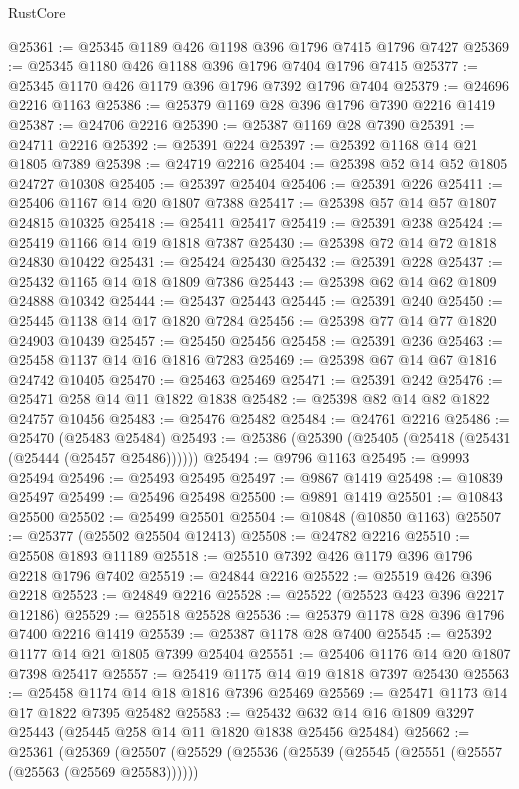 \begin{lexlean}{RustCore}
\begin{coremodule}
@25361 := @25345 @1189 @426 @1198 @396 @1796 @7415 @1796 @7427
@25369 := @25345 @1180 @426 @1188 @396 @1796 @7404 @1796 @7415
@25377 := @25345 @1170 @426 @1179 @396 @1796 @7392 @1796 @7404
@25379 := @24696 @2216 @1163
@25386 := @25379 @1169 @28 @396 @1796 @7390 @2216 @1419
@25387 := @24706 @2216
@25390 := @25387 @1169 @28 @7390
@25391 := @24711 @2216
@25392 := @25391 @224
@25397 := @25392 @1168 @14 @21 @1805 @7389
@25398 := @24719 @2216
@25404 := @25398 @52 @14 @52 @1805 @24727 @10308
@25405 := @25397 @25404
@25406 := @25391 @226
@25411 := @25406 @1167 @14 @20 @1807 @7388
@25417 := @25398 @57 @14 @57 @1807 @24815 @10325
@25418 := @25411 @25417
@25419 := @25391 @238
@25424 := @25419 @1166 @14 @19 @1818 @7387
@25430 := @25398 @72 @14 @72 @1818 @24830 @10422
@25431 := @25424 @25430
@25432 := @25391 @228
@25437 := @25432 @1165 @14 @18 @1809 @7386
@25443 := @25398 @62 @14 @62 @1809 @24888 @10342
@25444 := @25437 @25443
@25445 := @25391 @240
@25450 := @25445 @1138 @14 @17 @1820 @7284
@25456 := @25398 @77 @14 @77 @1820 @24903 @10439
@25457 := @25450 @25456
@25458 := @25391 @236
@25463 := @25458 @1137 @14 @16 @1816 @7283
@25469 := @25398 @67 @14 @67 @1816 @24742 @10405
@25470 := @25463 @25469
@25471 := @25391 @242
@25476 := @25471 @258 @14 @11 @1822 @1838
@25482 := @25398 @82 @14 @82 @1822 @24757 @10456
@25483 := @25476 @25482
@25484 := @24761 @2216
@25486 := @25470 (@25483 @25484)
@25493 := @25386 (@25390 (@25405 (@25418 (@25431 (@25444 (@25457 @25486))))))
@25494 := @9796 @1163
@25495 := @9993 @25494
@25496 := @25493 @25495
@25497 := @9867 @1419
@25498 := @10839 @25497
@25499 := @25496 @25498
@25500 := @9891 @1419
@25501 := @10843 @25500
@25502 := @25499 @25501
@25504 := @10848 (@10850 @1163)
@25507 := @25377 (@25502 @25504 @12413)
@25508 := @24782 @2216
@25510 := @25508 @1893 @11189
@25518 := @25510 @7392 @426 @1179 @396 @1796 @2218 @1796 @7402
@25519 := @24844 @2216
@25522 := @25519 @426 @396 @2218
@25523 := @24849 @2216
@25528 := @25522 (@25523 @423 @396 @2217 @12186)
@25529 := @25518 @25528
@25536 := @25379 @1178 @28 @396 @1796 @7400 @2216 @1419
@25539 := @25387 @1178 @28 @7400
@25545 := @25392 @1177 @14 @21 @1805 @7399 @25404
@25551 := @25406 @1176 @14 @20 @1807 @7398 @25417
@25557 := @25419 @1175 @14 @19 @1818 @7397 @25430
@25563 := @25458 @1174 @14 @18 @1816 @7396 @25469
@25569 := @25471 @1173 @14 @17 @1822 @7395 @25482
@25583 := @25432 @632 @14 @16 @1809 @3297 @25443 (@25445 @258 @14 @11 @1820 @1838 @25456 @25484)
@25662 := @25361
    (@25369
      (@25507
        (@25529
          (@25536
            (@25539 (@25545 (@25551 (@25557 (@25563 (@25569 @25583))))))

\end{coremodule}
\end{lexlean}
